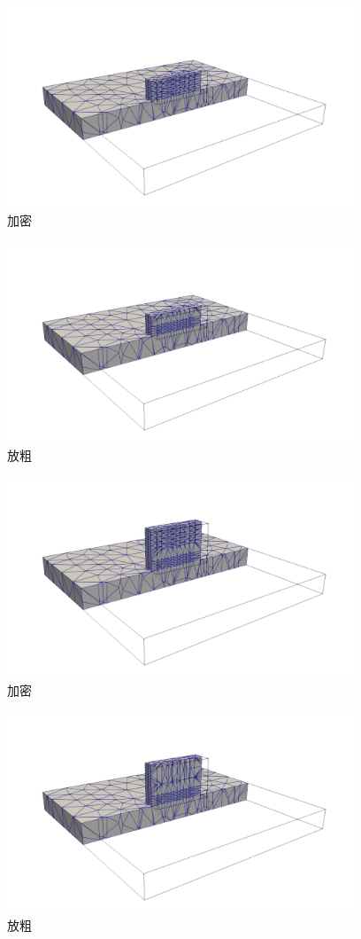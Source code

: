 \begin{figure}[!htbp]
  \centering
  \includegraphics[height=6cm]{fig/2/22.png}
  \caption{加密}
  \label{fig:2-1}
\end{figure}

\begin{figure}[!htbp]
  \centering
  \includegraphics[height=6cm]{fig/2/23.png}
  \caption{放粗}
  \label{fig:2-1}
\end{figure}

\begin{figure}[!htbp]
  \centering
  \includegraphics[height=6cm]{fig/2/24.png}
  \caption{加密}
  \label{fig:2-1}
\end{figure}

\begin{figure}[!htbp]
  \centering
  \includegraphics[height=6cm]{fig/2/25.png}
  \caption{放粗}
  \label{fig:2-1}
\end{figure}

